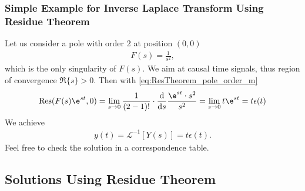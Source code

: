 \subsubsection{Simple Example for Inverse Laplace Transform Using Residue Theorem}
Let us consider a pole with order 2 at position $(0,0)$
\begin{align}
	F(s)=\frac{1}{s^2},
\end{align}
which is the only singularity of $F(s)$.
%
We aim at causal time signals, thus region of convergence $\Re\{s\} > 0$.
%
Then with \eqref{eq:ResTheorem_pole_order_m}
\begin{align}
	\mathrm{Res}(F(s)\e^{st},0)=\lim\limits_{s\rightarrow0}\frac{1}{(2-1)!}\cdot\frac{\mathrm{d}}{\mathrm{d}s}\frac{\e^{st}\cdot s^2}{s^2}=\lim\limits_{s\rightarrow0}t\e^{st}=t \epsilon(t)
\end{align}
We achieve
\begin{align}
	y(t)=\mathcal{L}^{-1}[Y(s)]=t \epsilon(t).
\end{align}
Feel free to check the solution in a correspondence table.
\pagebreak
\subsection{Solutions Using Residue Theorem}
\label{sec:ResidueTheorem}
